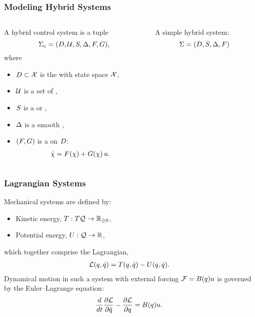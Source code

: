 \begin{frame}[t]
  \frametitle{Modeling Hybrid Systems}
  \begin{columns}
    \begin{column}{.63\textwidth}
      \begin{definition}
        A \alert{hybrid control system} is a tuple \vspace{-.3cm}
        $$\HCS = \hcsystem, \vspace{-.4cm}$$
        where
        \begin{itemize}
        \item
          $D \subset \mathcal{X}$ is the  with state space $\mathcal{X}$,
        \item
          $\mathcal{U}$ is a set of ,
        \item
          $S$ is a  or ,
        \item
          $\Delta$ is a smooth ,
        \item
          $(F, G)$ is a  on $D$: \vspace{-3mm}
          \begin{align*}
            {\dot {\chi}} = F(\chi) + G(\chi) \, u.
          \end{align*}
        \end{itemize}
      \end{definition}
    \end{column}
    \begin{column}{.4\textwidth}
      \begin{figure}    
        \centering
        \def\svgwidth{.8\columnwidth}
        
      \end{figure}
      \vspace{-1em}
      A \alert{simple hybrid system}:\vspace{-.5em}
      $$\Sigma = (D, S, \Delta, F)$$
    \end{column}
  \end{columns}
\end{frame}

\begin{frame}[t]
  \frametitle{Lagrangian Systems}
  Mechanical systems are defined by:
  \begin{itemize}
  \item Kinetic energy, $T : T\mathcal{Q} \to \mathbb{R}_{\geq 0}$,\\
  \item Potential energy, $U : \mathcal{Q} \to \mathbb{R}$,
  \end{itemize}
  which together comprise the Lagrangian,
  \begin{align*}
    \mathcal{L}(q, \dot q) = T(q, \dot q) - U(q, \dot q).
  \end{align*}
  Dynamical motion in such a system with external forcing $\mathcal{F} = B(q) u$ is governed by the Euler--Lagrange equation:
  \begin{align*}
    \frac{d}{dt} \frac{\partial{\ensuremath{\mathcal{L}}}}{\partial{\ensuremath{\dot q}}} - \frac{\partial{\ensuremath{\mathcal{L}}}}{\partial{\ensuremath{q}}} = B(q) u.
  \end{align*}
\end{frame}

